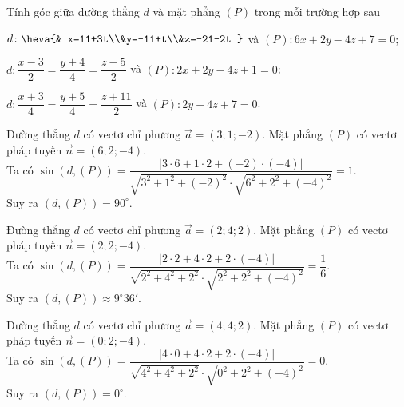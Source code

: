 \begin{bt}%

	Tính góc giữa đường thẳng $d$ và mặt phẳng $(P)$ trong mỗi trường hợp sau
	\begin{listEX}[1]
		\item $d\colon\heva{& x=11+3t\\&y=-11+t\\&z=-21-2t }$ và $(P)\colon 6x+2y-4z+7=0$;
		\item $d\colon\dfrac{x-3}{2}=\dfrac{y+4}{4}=\dfrac{z-5}{2}$ và $(P)\colon 2x+2y-4z+1=0$;
		\item $d\colon \dfrac{x+3}{4}=\dfrac{y+5}{4}=\dfrac{z+11}{2}$ và $(P)\colon 2y-4z+7=0$.
	\end{listEX}
	\loigiai
	{
		\begin{listEX}[1]
			\item Đường thẳng $d$ có vectơ chỉ phương $\overrightarrow{a}=(3;1;-2)$. Mặt phẳng $(P)$ có vectơ pháp tuyến $\overrightarrow{n}=(6;2;-4)$.\\
			Ta có $\sin (d,(P))=\dfrac{\left |3\cdot 6+1\cdot 2+(-2)\cdot (-4) \right |}{\sqrt{3^2+1^2+(-2)^2}\cdot\sqrt{6^2+2^2+(-4)^2}}=1$.\\
			Suy ra $(d,(P))=90^{\circ}$.
			\item Đường thẳng $d$ có vectơ chỉ phương $\overrightarrow{a}=(2;4;2)$. Mặt phẳng $(P)$ có vectơ pháp tuyến $\overrightarrow{n}=(2;2;-4)$.\\
			Ta có $\sin (d,(P))=\dfrac{\left |2\cdot 2+4\cdot 2+2\cdot (-4) \right |}{\sqrt{2^2+4^2+2^2}\cdot\sqrt{2^2+2^2+(-4)^2}}=\dfrac{1}{6}$.\\
			Suy ra $(d,(P))\approx 9^{\circ}36'$.
			\item Đường thẳng $d$ có vectơ chỉ phương $\overrightarrow{a}=(4;4;2)$. Mặt phẳng $(P)$ có vectơ pháp tuyến $\overrightarrow{n}=(0;2;-4)$.\\
			Ta có $\sin (d,(P))=\dfrac{\left |4\cdot 0+4\cdot 2+2\cdot (-4) \right |}{\sqrt{4^2+4^2+2^2}\cdot\sqrt{0^2+2^2+(-4)^2}}=0$.\\
			Suy ra $(d,(P))=0^{\circ}$.
		\end{listEX}
	}
\end{bt}

